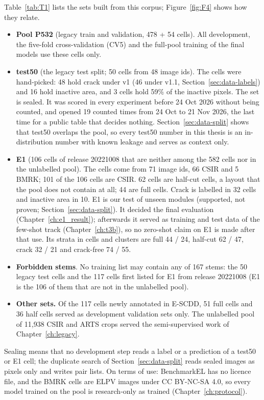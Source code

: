 Table~\ref{tab:T1} lists the sets built from this corpus; Figure~\ref{fig:F4} shows how they relate.
\begin{itemize}
  \item \textbf{Pool P532} (legacy train and validation, 478 + 54 cells). All development, the five-fold cross-validation (CV5) and
    the full-pool training of the final models use these cells only.
  \item \textbf{test50} (the legacy test split; 50 cells from 48 image ids). The cells were hand-picked: 48 hold crack under v1 (46
    under v1.1, Section~\ref{sec:data-labels}) and 16 hold inactive area, and 3 cells hold 59\% of the inactive pixels. The set is sealed. It was scored in every experiment before 24 Oct
    2026 without being counted, and opened 19 counted times from 24 Oct to 21 Nov 2026, the last time for a public table that
    decides nothing. Section~\ref{sec:data-split} shows that test50 overlaps the pool, so every test50 number in this thesis is an
    in-distribution number with known leakage and serves as context only.
  \item \textbf{E1} (106 cells of release 20221008 that are neither among the 582 cells nor in the unlabelled pool). The cells come
    from 71 image ids, 66 CSIR and 5 BMRK; 101 of the 106 cells are CSIR. 62 cells are half-cut cells, a layout that the pool does not
    contain at all; 44 are full cells. Crack is labelled in 32 cells and inactive area in 10. E1 is our test of unseen modules
    (supported, not proven; Section~\ref{sec:data-split}). It decided the final evaluation (Chapter~\ref{ch:e1_result}); afterwards it
    served as training and test data of the few-shot track (Chapter~\ref{ch:t3b}), so no zero-shot claim on E1 is made after that
    use. Its strata in cells and clusters are full 44 / 24, half-cut 62 / 47, crack 32 / 21 and crack-free 74 / 55.
  \item \textbf{Forbidden stems}. No training list may contain any of 167 stems: the 50 legacy test cells and the 117 cells first
    listed for E1 from release 20221008 (E1 is the 106 of them that are not in the unlabelled pool).
  \item \textbf{Other sets.} Of the 117 cells newly annotated in E-SCDD, 51 full cells and 36 half cells served as development
    validation sets only.
    The unlabelled pool of 11,938 CSIR and ARTS crops served the semi-supervised work of Chapter~\ref{ch:legacy}.
\end{itemize}

Sealing means that no development step reads a label or a prediction of a test50 or E1 cell; the duplicate search of
Section~\ref{sec:data-split} reads sealed images as pixels only and writes pair lists. On terms of use: BenchmarkEL has no licence
file, and the BMRK cells are ELPV images under CC BY-NC-SA 4.0, so every model trained on the pool is research-only as trained
(Chapter~\ref{ch:protocol}).

